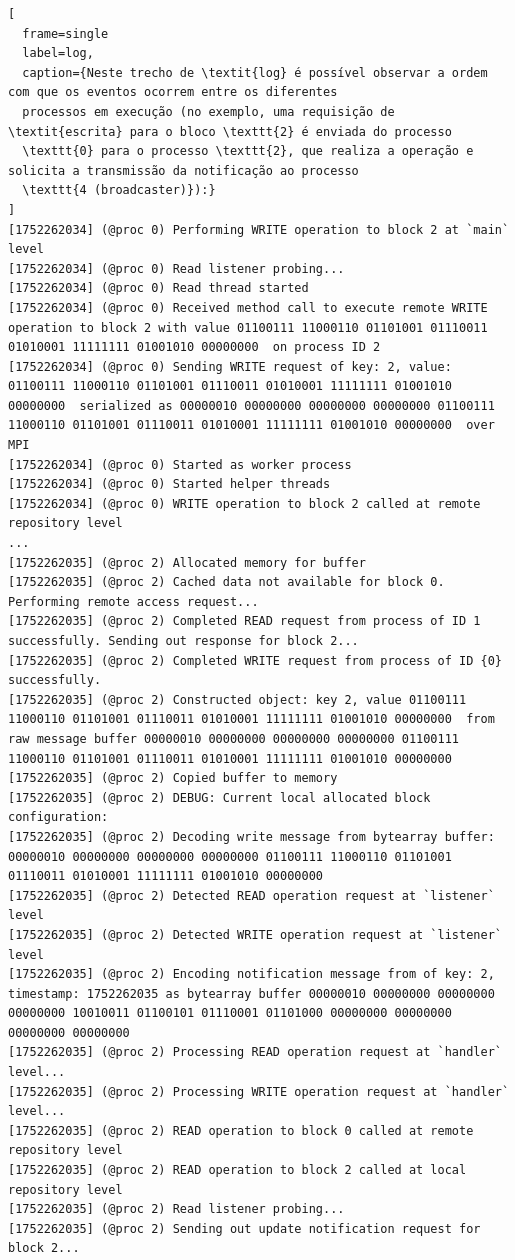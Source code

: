 \documentclass[12pt]{article}
\begin{document}
\begin{lstlisting}[
  frame=single
  label=log,
  caption={Neste trecho de \textit{log} é possível observar a ordem com que os eventos ocorrem entre os diferentes
  processos em execução (no exemplo, uma requisição de \textit{escrita} para o bloco \texttt{2} é enviada do processo
  \texttt{0} para o processo \texttt{2}, que realiza a operação e solicita a transmissão da notificação ao processo
  \texttt{4 (broadcaster)}):}
]
[1752262034] (@proc 0) Performing WRITE operation to block 2 at `main` level
[1752262034] (@proc 0) Read listener probing...
[1752262034] (@proc 0) Read thread started
[1752262034] (@proc 0) Received method call to execute remote WRITE operation to block 2 with value 01100111 11000110 01101001 01110011 01010001 11111111 01001010 00000000  on process ID 2
[1752262034] (@proc 0) Sending WRITE request of key: 2, value: 01100111 11000110 01101001 01110011 01010001 11111111 01001010 00000000  serialized as 00000010 00000000 00000000 00000000 01100111 11000110 01101001 01110011 01010001 11111111 01001010 00000000  over MPI
[1752262034] (@proc 0) Started as worker process
[1752262034] (@proc 0) Started helper threads
[1752262034] (@proc 0) WRITE operation to block 2 called at remote repository level
...
[1752262035] (@proc 2) Allocated memory for buffer
[1752262035] (@proc 2) Cached data not available for block 0. Performing remote access request...
[1752262035] (@proc 2) Completed READ request from process of ID 1 successfully. Sending out response for block 2...
[1752262035] (@proc 2) Completed WRITE request from process of ID {0} successfully.
[1752262035] (@proc 2) Constructed object: key 2, value 01100111 11000110 01101001 01110011 01010001 11111111 01001010 00000000  from raw message buffer 00000010 00000000 00000000 00000000 01100111 11000110 01101001 01110011 01010001 11111111 01001010 00000000 
[1752262035] (@proc 2) Copied buffer to memory
[1752262035] (@proc 2) DEBUG: Current local allocated block configuration: 
[1752262035] (@proc 2) Decoding write message from bytearray buffer: 00000010 00000000 00000000 00000000 01100111 11000110 01101001 01110011 01010001 11111111 01001010 00000000 
[1752262035] (@proc 2) Detected READ operation request at `listener` level
[1752262035] (@proc 2) Detected WRITE operation request at `listener` level
[1752262035] (@proc 2) Encoding notification message from of key: 2, timestamp: 1752262035 as bytearray buffer 00000010 00000000 00000000 00000000 10010011 01100101 01110001 01101000 00000000 00000000 00000000 00000000 
[1752262035] (@proc 2) Processing READ operation request at `handler` level...
[1752262035] (@proc 2) Processing WRITE operation request at `handler` level...
[1752262035] (@proc 2) READ operation to block 0 called at remote repository level
[1752262035] (@proc 2) READ operation to block 2 called at local repository level
[1752262035] (@proc 2) Read listener probing...
[1752262035] (@proc 2) Sending out update notification request for block 2...
\end{lstlisting}
\end{document}
